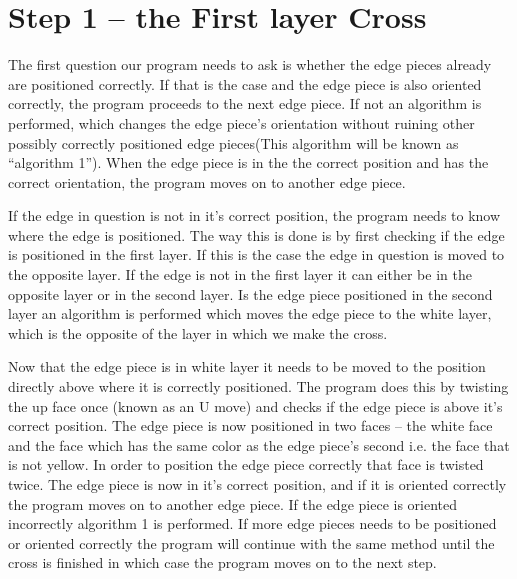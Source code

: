 \section{Step 1 -- the First layer Cross}
The first question our program needs to ask is whether the edge pieces already are positioned correctly. If that is the case and the edge piece is also oriented correctly, the program proceeds to the next edge piece. If not an algorithm is performed, which changes the edge piece's orientation without ruining other possibly correctly positioned edge pieces(This algorithm will be known as "`algorithm 1"'). When the edge piece is in the the correct position and has the correct orientation, the program moves on to another edge piece. 

If the edge \cpiece{} in question is not in it's correct position, the program needs to know where the edge is positioned. 
The way this is done is by first checking if the edge \cpiece{} is positioned in the first layer. 
If this is the case the edge \cpiece{} in question is moved to the opposite layer. 
If the edge \cpiece{} is not in the first layer it can either be in the opposite layer or in the second layer.
Is the edge piece positioned in the second layer an algorithm is performed which moves the edge piece to the white layer, which is the opposite of the layer in which we make the cross.

Now that the edge piece is in white layer it needs to be moved to the position directly above where it is correctly positioned. 
The program does this by twisting the up face once (known as an U move) and checks if the edge piece is above it's correct position.
The edge piece is now positioned in two faces -- the white face and the face which has the same color as the edge piece's second \facelet{} i.e. the face that is not yellow.
In order to position the edge piece correctly that face is twisted twice.
The edge piece is now in it's correct position, and if it is oriented correctly the program moves on to another edge piece.
If the edge piece is oriented incorrectly algorithm 1 is performed. If more edge pieces needs to be positioned or oriented correctly the program will continue with the same method until the cross is finished in which case the program moves on to the next step.

